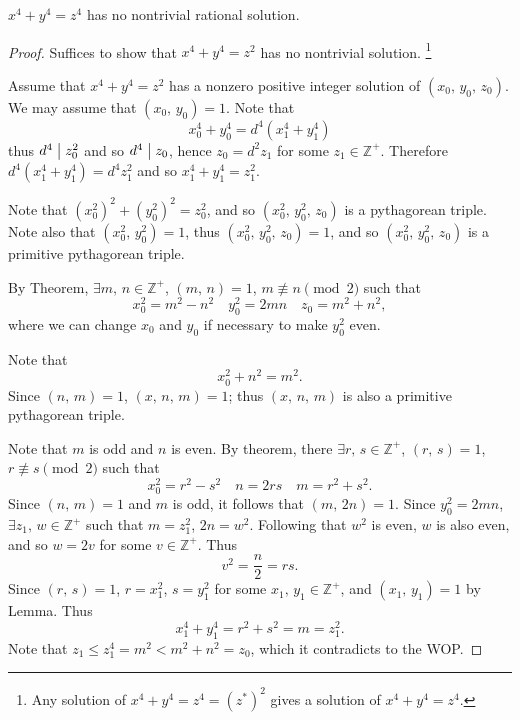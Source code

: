 
\begin{theorem}
    $x^4+y^4=z^4$ has no nontrivial rational solution.
\end{theorem}

\begin{proof}
    Suffices to show that $x^4+y^4=z^2$ has no nontrivial solution.
    \footnote{Any solution of $x^4+y^4=z^4=\left(z^*\right)^2$
    gives a solution of $x^4+y^4=z^4$.}

    Assume that $x^4+y^4=z^2$ has a nonzero positive integer solution of $\left(x_0,\,y_0,\,z_0\right)$.
    We may assume that $\left(x_0,\,y_0\right)=1$. Note that
    \[
        x_0^4+y_0^4=d^4\left(x_1^4+y_1^4\right)
    \]
    thus $d^4 \bigm| z_0^2$ and so $d^4 \bigm| z_0$, hence $z_0=d^2z_1$ for
    some $z_1\in\mathbb{Z}^+$. Therefore
    $d^4\left(x_1^4+y_1^4\right)=d^4z_1^2$ and so $x_1^4+y_1^4=z_1^2$.

    Note that $\left(x_0^2\right)^2+\left(y_0^2\right)^2=z_0^2$, and so
    $\left(x_0^2,\,y_0^2,\,z_0\right)$ is a pythagorean triple.
    Note also that $\left(x_0^2,\,y_0^2\right)=1$,
    thus $\left(x_0^2,\,y_0^2,\,z_0\right)=1$, and so $\left(x_0^2,\,y_0^2,\,z_0\right)$
    is a primitive pythagorean triple.

    By Theorem, $\exists m,\,n \in \mathbb{Z}^+$, $\left(m,\,n\right)=1$,
    $m \not\equiv n \pmod{2}$ such that 
    \[
        x_0^2=m^2-n^2 \quad y_0^2=2mn \quad z_0=m^2+n^2,
    \]
    where we can change $x_0$ and $y_0$ if necessary to make $y_0^2$ even.

    Note that
    \[
        x_0^2+n^2=m^2.
    \]
    Since $\left(n,\,m\right)=1$, $\left(x,\,n,\,m\right)=1$; thus
    $\left(x,\,n,\,m\right)$ is also a primitive pythagorean triple.
    
    Note that $m$ is odd and $n$ is even. By theorem, there $\exists r,\,s \in \mathbb{Z}^+$,
    $\left(r,\,s\right)=1$, $r \not\equiv s \pmod{2}$ such that
    \[
        x_0^2=r^2-s^2 \quad n=2rs \quad m=r^2+s^2.
    \]
    Since $\left(n,\,m\right)=1$ and $m$ is odd, it follows that $\left(m,\,2n\right)=1$.
    Since $y_0^2=2mn$, $\exists z_1,\,w \in \mathbb{Z}^+$ such that $m=z_1^2$,
    $2n=w^2$. Following that $w^2$ is even, $w$ is also even, and so $w=2v$ for
    some $v \in \mathbb{Z}^+$. Thus
    \[
        v^2=\frac{n}{2}=rs.
    \]
    Since $\left(r,\,s\right)=1$, $r=x_1^2$, $s=y_1^2$ for some $x_1,\,y_1\in\mathbb{Z}^+$,
    and $\left(x_1,\,y_1\right)=1$ by Lemma. Thus
    \[
        x_1^4+y_1^4=r^2+s^2=m=z_1^2.
    \]
    Note that $z_1 \leq z_1^4 = m^2 < m^2+n^2 = z_0$, which it contradicts to
    the WOP.
\end{proof}

